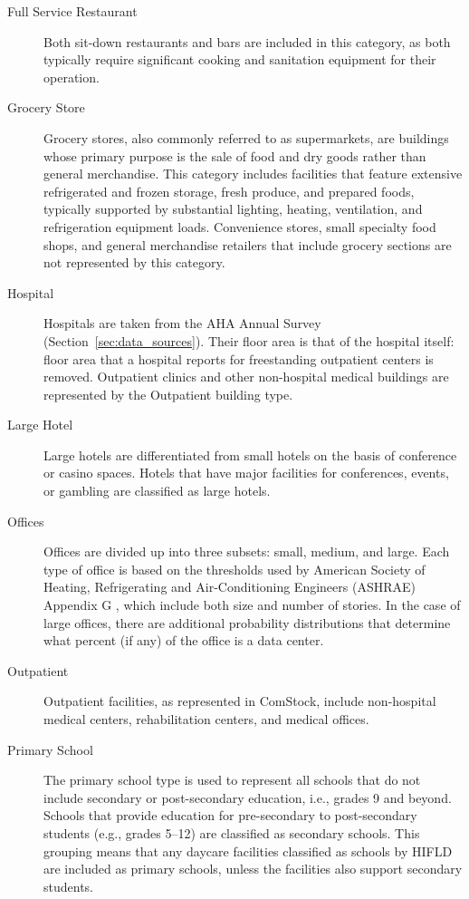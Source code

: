 \begin{description}
\item [Full Service Restaurant] Both sit-down restaurants and bars are included in this category, as both typically require significant cooking and sanitation equipment for their operation.
\item[Grocery Store] Grocery stores, also commonly referred to as supermarkets, are buildings whose primary purpose is the sale of food and dry goods rather than general merchandise. This category includes facilities that feature extensive refrigerated and frozen storage, fresh produce, and prepared foods, typically supported by substantial lighting, heating, ventilation, and refrigeration equipment loads. Convenience stores, small specialty food shops, and general merchandise retailers that include grocery sections are not represented by this category.
\item[Hospital] Hospitals are taken from the AHA Annual Survey (Section~\ref{sec:data_sources}). Their floor area is that of the hospital itself: floor area that a hospital reports for freestanding outpatient centers is removed. Outpatient clinics and other non-hospital medical buildings are represented by the Outpatient building type.
\item[Large Hotel] Large hotels are differentiated from small hotels on the basis of conference or casino spaces. Hotels that have major facilities for conferences, events, or gambling are classified as large hotels.
\item[Offices] Offices are divided up into three subsets: small, medium, and large. Each type of office is based on the thresholds used by American Society of Heating, Refrigerating and Air-Conditioning Engineers (ASHRAE) Appendix G \citep{ashrae_901_2010}, which include both size and number of stories. In the case of large offices, there are additional probability distributions that determine what percent (if any) of the office is a data center.
\item[Outpatient] Outpatient facilities, as represented in ComStock, include non-hospital medical centers, rehabilitation centers, and medical offices.
\item[Primary School] The primary school type is used to represent all schools that do not include secondary or post-secondary education, i.e., grades 9 and beyond. Schools that provide education for pre-secondary to post-secondary students (e.g., grades 5--12) are classified as secondary schools. This grouping means that any daycare facilities classified as schools by HIFLD are included as primary schools, unless the facilities also support secondary students.

\end{description}
